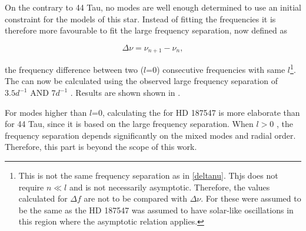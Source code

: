 On the contrary to 44 Tau, no modes are well enough determined to use an initial constraint for the models of this star. Instead of fitting the frequencies it is therefore more favourable to fit the large frequency separation, now defined as

\begin{equation}
    \Delta\nu = \nu_{n+1} - \nu_{n},
\end{equation}

\noindent the frequency difference between two ($l$=0) consecutive frequencies with same $l$\footnote{This is not the same frequency separation as in \eqref{deltanu}. Thjs does not require $n \ll l$ and is not necessarily asymptotic. Therefore, the values calculated for $\Delta f$ are not to be compared with $\Delta \nu$. For \citet{antoci2011excitation} these were assumed to be the same as the HD 187547 was assumed to have solar-like oscillations in this region where the asymptotic relation applies.}.  The \chis can now be calculated using the observed large frequency separation of $3.5d^{-1}$ AND $7d^{-1}$ \citep{antoci2014role}. Results are shown shown in .



For modes higher than $l$=0, calculating the \chis for HD 187547 is more elaborate than for 44 Tau, since it is based on the large frequency separation. When $l>0$ , the frequency separation depends significantly on the mixed modes and radial order. Therefore, this part is beyond the scope of this work. 

